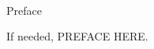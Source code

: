 \pagestyle{plain} \setcounter{page}{2}
\renewcommand{\baselinestretch}{2}
\small\normalsize
\hbox{\ }

\vspace{.5in}

\begin{center}
\large{Preface}
\end{center}


If needed, PREFACE HERE.
